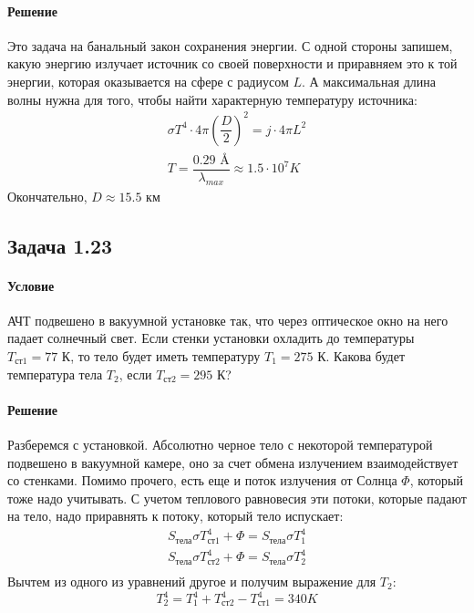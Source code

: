 \documentclass[12pt]{article}
\begin{document}
\paragraph{Решение}
Это задача на банальный закон сохранения энергии. С одной стороны запишем, какую энергию излучает источник со своей поверхности и приравняем это к той энергии, которая оказывается на сфере с радиусом $L$. А максимальная длина волны нужна для того, чтобы найти характерную температуру источника:
\begin{gather*}
    \sigma T^4 \cdot 4\pi\left( \dfrac{D}{2}\right)^2 = j\cdot4\pi L^2 \\
    T = \dfrac{0.29 \text{ \AA}}{\lambda_{max}} \approx 1.5 \cdot 10^7 K
\end{gather*}
Окончательно, $D\approx15.5$ км

\subsection{Задача 1.23}
\label{task_123}
\paragraph{Условие}
АЧТ подвешено в вакуумной установке так, что через оптическое окно на него падает солнечный свет. Если стенки установки охладить до температуры $T_{\text{ст1}} = 77 $ К, то тело будет иметь температуру $T_{1} = 275 $ К. Какова будет температура тела $T_2$, если $T_{\text{ст2}} = 295 $ К?
\paragraph{Решение}
Разберемся с установкой. Абсолютно черное тело с некоторой температурой подвешено в вакуумной камере, оно за счет обмена излучением взаимодействует со стенками. Помимо прочего, есть еще и поток излучения от Солнца $\Phi$, который тоже надо учитывать. С учетом теплового равновесия эти потоки, которые падают на тело, надо приравнять к потоку, который тело испускает:
\begin{gather*}
    S_{\text{тела}}\sigma T^4_{\text{ст1}} + \Phi = S_{\text{тела}}\sigma T^4_1\\
    S_{\text{тела}}\sigma T^4_{\text{ст2}} + \Phi = S_{\text{тела}}\sigma T^4_2\\
\end{gather*}
Вычтем из одного из уравнений другое и получим выражение для $T_2$:
\begin{equation*}
    T_2^4 = T_1^4 + T^4_{\text{ст2}} - T^4_{\text{ст1}} = 340 K
\end{equation*}
\end{document}
